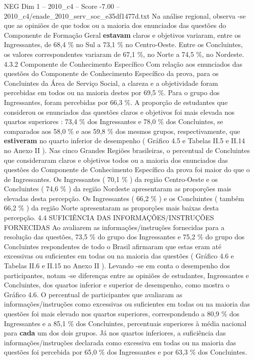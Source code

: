 \begin{textsample}{NEG Dim 1 – 2010\_c4 – Score -7.00 – 2010\_c4/enade\_2010\_serv\_soc\_e35df1477d.txt}
Na análise regional, observa -se que as opiniões de que todos ou a maioria dos enunciados das questões do Componente de Formação Geral \textbf{estavam} claros e objetivos variaram, entre os Ingressantes, de 68,4 \% no Sul a 73,1 \% no Centro-Oeste.
Entre os Concluintes, os valores correspondentes variaram de 67,1 \%, no Norte a 74,5 \%, no Nordeste. 4.3.2 Componente de Conhecimento Específico Com relação aos enunciados das questões do Componente de Conhecimento Específico da prova, para os Concluintes da Área de Serviço Social, a clareza e a objetividade foram percebidas em todos ou na maioria destes por 69,5 \%.
Para o grupo dos Ingressantes, foram percebidas por 66,3 \%.
A proporção de estudantes que considerou os enunciados das questões claros e objetivos foi mais elevada nos quartos superiores : 73,4 \% dos Ingressantes e 78,0 \% dos Concluintes, se comparados aos 58,0 \% e aos 59,8 \% dos mesmos grupos, respectivamente, que \textbf{estiveram} no quarto inferior de desempenho ( Gráfico 4.5 e Tabelas II.5 e II.14 no Anexo II ).
Nas cinco Grandes Regiões brasileiras, o percentual de Concluintes que consideraram claros e objetivos todos ou a maioria dos enunciados das questões do Componente de Conhecimento Específico da prova foi maior do que o de Ingressantes.
Os Ingressantes ( 70,1 \% ) da região Centro-Oeste e os Concluintes ( 74,6 \% ) da região Nordeste apresentaram as proporções mais elevadas desta percepção.
Os Ingressantes ( 66,2 \% ) e os Concluintes ( também 66,2 \% ) da região Norte apresentaram as proporções mais baixas desta percepção. 4.4 SUFICIÊNCIA DAS INFORMAÇÕES/INSTRUÇÕES FORNECIDAS Ao avaliarem as informações/instruções fornecidas para a resolução das questões, 73,5 \% do grupo dos Ingressantes e 75,2 \% do grupo dos Concluintes respondentes de todo o Brasil afirmaram que estas eram até excessivas ou suficientes em todas ou na maioria das questões ( Gráfico 4.6 e Tabelas II.6 e II.15 no Anexo II ).
Levando -se em conta o desempenho dos participantes, notam -se diferenças entre as opiniões de estudantes, Ingressantes e Concluintes, dos quartos inferior e superior de desempenho, como mostra o Gráfico 4.6.
O percentual de participantes que avaliaram as informações/instruções como excessivas ou suficientes em todas ou na maioria das questões foi mais elevado nos quartos superiores, correspondendo a 80,9 \% dos Ingressantes e a 85,1 \% dos Concluintes, percentuais superiores à média nacional para \textbf{cada} um dos dois grupos.
Já nos quartos inferiores, a suficiência das informações/instruções declarada como excessiva em todas ou na maioria das questões foi percebida por 65,0 \% dos Ingressantes e por 63,3 \% dos Concluintes.

\end{textsample}
